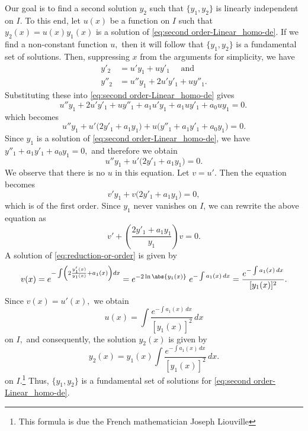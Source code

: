  Our goal is to find  a second solution $y_2$ such that $\{y_1, y_2\}$ is  linearly independent on $I.$ To this end, 
let $u(x)$ be a function on $I$ such that $y_2 (x) = u(x) y_1(x)$ is a solution of \eqref{eq:second order-Linear_homo-de}.  If we  find a non-constant function $u,$ then it will follow that $\{y_1, y_2\}$ is a fundamental set of solutions. Then,  suppressing $x$ from the arguments for simplicity,  we have
\[\begin{split}
	y'_2 &= u' y_1 + u y'_1\quad \mbox{ and }\\
	y''_2 &= u'' y_1 +2u' y'_1+ u y''_1.
\end{split}\]
Substituting these into \eqref{eq:second order-Linear_homo-de} gives
\[
	u'' y_1 +2u' y'_1+ u y''_1
	+a_1u' y_1 + a_1u y'_1
	+ a_0 u y_1=0.\,
\]
which becomes
\[
	u'' y_1 +u'\big(2 y'_1+ a_1y_1\big)
	+u\big( y''_1 + a_1 y'_1+ a_0 y_1\big) =0.
\]
Since $y_1$ is a solution of
 \eqref{eq:second order-Linear_homo-de}, we have \(y''_1 + a_1 y'_1 +a_0 y_1 = 0,\)  and therefore we obtain
 \[
 	u'' y_1 +u'\Big(2 y'_1 +a_1y_1\Big) =0.
\]
 We observe that there is no $u$ in this equation. Let $v = u'.$ Then the equation becomes
 \[
 v' y_1 +v\Big(2 y'_1 +a_1y_1\Big) =0,
 \]
 which is of the first order.
 Since $y_1$ never vanishes on $I$, we can rewrite the above equation as 
 \begin{equation}\label{eq:reduction-or-order}
 v'  +\left(\frac{2 y'_1 +a_1y_1}{y_1}\right) v =0.
 \end{equation}
 A solution of \eqref{eq:reduction-or-order} is given by
 \[
 v(x) = e^{-\int\left(2\frac{y'_1(x)}{y_1(x)}+a_1(x)\right)dx}=  e^{-2\ln\abs{y_1(x)}} \; e^{-\int a_1(x)\, dx}= \frac{e^{-\int a_1(x)\, dx}}{[y_1(x)]^2}.\]
 Since $v(x) = u'(x),$ we obtain 
 \[u(x) = \int \frac{e^{-\int a_1(x)\, dx}}{[y_1(x)]^2}\, dx\] on $I,$
and consequently, the solution $y_2(x)$ is given by 
 \begin{equation}\label{eq:reduction-of-order-formula}
 	\boxed{y_2(x)  = y_1(x) \int \frac{e^{-\int a_1(x)\, dx}}{[y_1(x)]^2}\, dx.}
 \end{equation} on $I.$\footnote[1]{This formula is due  the French mathematician Joseph Liouville}  Thus, $\{y_1, y_2\}$ is a fundamental set of solutions for \eqref{eq:second order-Linear_homo-de}. \\
 
